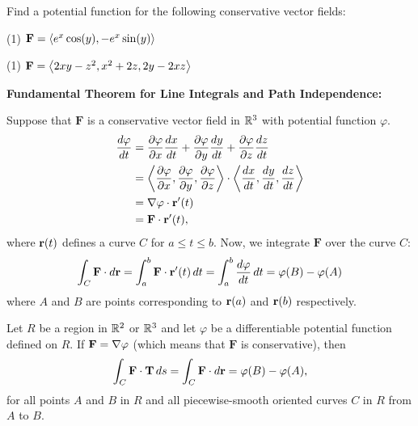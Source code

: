 \documentclass[mathNotesPreamble]{subfiles}
\begin{document}
  \begin{ex*}
    Find a potential function for the following conservative vector fields:
  \end{ex*}
  \begin{tasks}[after-item-skip=\stretch{1}, label=](1)
    \task $\mathbf F={\left\langle e^x\cos(y),-e^x\sin(y) \right\rangle}$
  \end{tasks}
  \pagebreak

  \begin{tasks}[after-item-skip=\stretch{1}, label=](1)
    \task $\mathbf F={\left\langle 2xy-z^2, x^2+2z, 2y-2xz \right\rangle}$
  \end{tasks}
  \pagebreak

  \noindent\textbf{Fundamental Theorem for Line Integrals and Path Independence:}

  \noindent Suppose that $\mathbf F$ is a conservative vector field in $\mathbb{R}^3$ with potential function $\varphi$. 
  \begin{align*}
    \frac{d\varphi}{dt}&= \frac{\partial\varphi}{\partial x}\frac{dx}{dt}+\frac{\partial\varphi}{\partial y}\frac{dy}{dt}+\frac{\partial\varphi}{\partial z}\frac{dz}{dt}\\
      &={\left\langle \frac{\partial \varphi}{\partial x},\frac{\partial \varphi}{\partial y},\frac{\partial \varphi}{\partial z} \right\rangle}\cdot{\left\langle \frac{dx}{dt},\frac{dy}{dt},\frac{dz}{dt} \right\rangle}\\
      &=\nabla\varphi\cdot{\mathbf{r}}'(t)\\
      &=\mathbf F\cdot{\mathbf{r}}'(t),
  \end{align*}
  where ${\mathbf{r}}(t)$ defines a curve $C$ for $a\leq t\leq b$. Now, we integrate $\mathbf F$ over the curve $C$:
  \begin{align*}
    \int_C\mathbf F\cdot d{\mathbf{r}}= \int_a^b \mathbf F\cdot{\mathbf{r}}'(t)\,dt
      =\int_a^b \frac{d\varphi}{dt}\,dt
      =\varphi(B)-\varphi(A)
  \end{align*}
  where $A$ and $B$ are points corresponding to ${\mathbf{r}}(a)$ and ${\mathbf{r}}(b)$ respectively.


  \begin{thmBox*}
    Let $R$ be a region in $\mathbb{R}^2$ or $\mathbb{R}^3$ and let $\varphi$ be a differentiable potential function defined on $R$. If $\mathbf F=\nabla\varphi$ (which means that $\mathbf F$ is conservative), then
       \[\int_C \mathbf F\cdot{\mathbf{T}}\,ds=\int_C \mathbf F\cdot d{\mathbf{r}}=\varphi(B)-\varphi(A),\]
     for all points $A$ and $B$ in $R$ and all piecewise-smooth oriented curves $C$ in $R$ from $A$ to $B$.
  \end{thmBox*}
\end{document}
